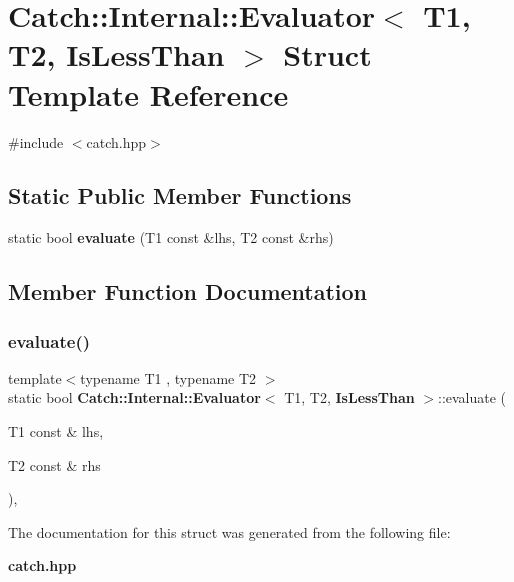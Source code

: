 \section{Catch\+:\+:Internal\+:\+:Evaluator$<$ T1, T2, Is\+Less\+Than $>$ Struct Template Reference}
\label{struct_catch_1_1_internal_1_1_evaluator_3_01_t1_00_01_t2_00_01_is_less_than_01_4}


{\ttfamily \#include $<$catch.\+hpp$>$}

\subsection*{Static Public Member Functions}
\begin{DoxyCompactItemize}
\item 
static bool \textbf{ evaluate} (T1 const \&lhs, T2 const \&rhs)
\end{DoxyCompactItemize}


\subsection{Member Function Documentation}
\mbox{\label{struct_catch_1_1_internal_1_1_evaluator_3_01_t1_00_01_t2_00_01_is_less_than_01_4_a75b2bcf80ce6f90218c145e2c3293d75}} 
\subsubsection{evaluate()}
{\footnotesize\ttfamily template$<$typename T1 , typename T2 $>$ \\
static bool \textbf{ Catch\+::\+Internal\+::\+Evaluator}$<$ T1, T2, \textbf{ Is\+Less\+Than} $>$\+::evaluate (\begin{DoxyParamCaption}\item[{T1 const \&}]{lhs,  }\item[{T2 const \&}]{rhs }\end{DoxyParamCaption})\hspace{0.3cm}{\ttfamily [inline]}, {\ttfamily [static]}}



The documentation for this struct was generated from the following file\+:\begin{DoxyCompactItemize}
\item 
\textbf{ catch.\+hpp}\end{DoxyCompactItemize}
